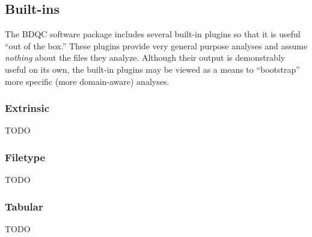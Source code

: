 \documentclass {article}
\begin{document}
\subsection{Built-ins}
The BDQC software package includes several built-in plugins so that it is
useful ``out of the box.'' These plugins provide very general purpose analyses
and assume \emph{nothing} about the files they analyze.
Although their output is demonstrably useful on its own, the built-in plugins
may be viewed as a means to ``bootstrap'' more specific (more domain-aware)
analyses.
\subsubsection{Extrinsic}
TODO
\subsubsection{Filetype}
TODO
\subsubsection{Tabular}
TODO




%
%
%
%
\end{document}
